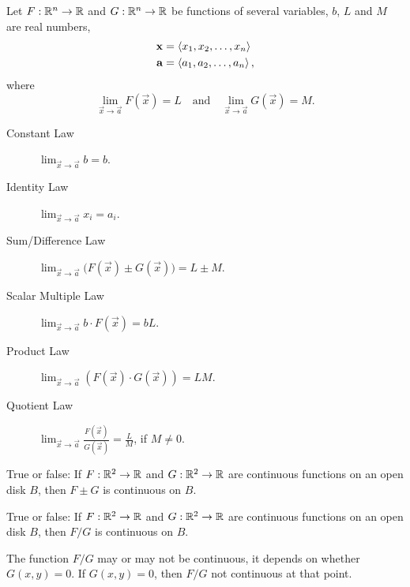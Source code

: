 \documentclass{ximera}
\begin{document}
\begin{theorem}
  Let $F:\mathbb R^n\to \mathbb R$ and $G:\mathbb R^n\to \mathbb R$ be functions of several
  variables, $b$, $L$ and $M$ are real numbers,
  \begin{align*}
    \mathbf{x} &= \left\langle x_1,x_2,\dots,x_n\right\rangle\\ \mathbf{a} &=
    \left\langle a_1,a_2,\dots,a_n\right\rangle,
  \end{align*}
  where
  \[
  \lim_{\vec{x}\to\vec{a}}F(\vec{x}) = L \quad \text{and}\quad \lim_{\vec{x}\to\vec{a}} G(\vec{x}) = M.
  \]
\begin{description}
\item[Constant Law] $\lim_{\vec{x}\to \vec{a}} b = b$.
\item[Identity Law] $\lim_{\vec{x}\to \vec{a}} x_i = a_i$.
\item[Sum/Difference Law] $\lim_{\vec{x}\to \vec{a}}\big(F(\vec{x})\pm G(\vec{x})\big) = L\pm M$.
\item[Scalar Multiple Law] $\lim_{\vec{x}\to \vec{a}} b\cdot F(\vec{x}) = bL$.
\item[Product Law] $\lim_{\vec{x}\to \vec{a}} \left(F(\vec{x})\cdot G(\vec{x})\right) = LM$.
\item[Quotient Law] $\lim_{\vec{x}\to \vec{a}} \frac{F(\vec{x})}{G(\vec{x})} = \frac{L}{M}$, if $M\neq 0$.
\end{description}
\end{theorem}

\begin{question}
  True or false: If $F:\mathbb R^2\to\mathbb R$ and $G:\mathbb R^2\to\mathbb R$ are continuous
  functions on an open disk $B$, then $F\pm G$ is continuous on $B$.
  \begin{prompt}
    \begin{multipleChoice}
  \end{multipleChoice}
  \end{prompt}
\end{question}

\begin{question}
  True or false: If $F:\mathbb R^2\to\mathbb R$ and $G:\mathbb R^2\to\mathbb R$ are continuous
  functions on an open disk $B$, then $F/G$ is continuous on $B$.
  \begin{prompt}
    \begin{multipleChoice}
    \end{multipleChoice}
    \begin{feedback}
      The function $F/G$ may or may not be continuous, it depends on
      whether $G(x,y)=0$. If $G(x,y)=0$, then $F/G$ not continuous at that point.
    \end{feedback}
  \end{prompt}
\end{question}
\end{document}
